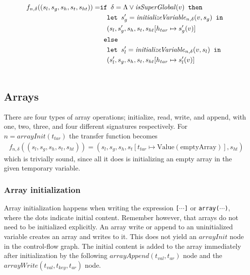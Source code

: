 \begin{align}
f_{n, \delta} ((s_l,s_g,s_h,s_t, s_{ht})) = &\texttt{if }\delta= \Lambda \vee \mathit{isSuperGlobal}(v)\texttt{ then } \notag\\
                                            &\quad\texttt{let }  s_g' = \mathit{initializeVariable}_{n,\delta}(v,s_g) \texttt{ in }\notag\\
                                            &\quad (s_l, s_g', s_h, s_t, s_{ht}[h_{tar}\mapsto s_g'(v)]\notag\\
                                            & \texttt{ else } \notag\\
                                            &\quad\texttt{let }  s_l' = \mathit{initializeVariable}_{n,\delta}(v,s_l) \texttt{ in }\notag\\
                                            &\quad (s_l', s_g, s_h, s_t, s_{ht}[h_{tar}\mapsto s_l'(v)]\notag\\
                                            &
\end{align}

\subsection{Arrays}

There are four types of array operations; initialize, read, write, and append, with one, two, three, and four different signatures respectively. For $n = \mathit{arrayInit}(t_{tar})$ the transfer function becomes
\begin{align}
f_{n,\delta}((s_l, s_g, s_h, s_t, s_{ht})) = (s_l, s_g, s_h, s_t[t_{tar}\mapsto \text{Value}(\text{emptyArray})], s_{ht})
\end{align}
which is trivially sound, since all it does is initializing an empty array in the given temporary variable.

\subsubsection{Array initialization}
Array initialization happens when writing the expression \texttt{[$\cdots$]} or \texttt{array($\cdots$)}, where the dots indicate initial content. Remember however, that arrays do not need to be initialized explicitly. An array write or append to an uninitialized variable creates an array and writes to it. This does not yield an $\mathit{arrayInit}$ node in the control-flow graph. The initial content is added to the array immediately after initialization by the following $\mathit{arrayAppend}(t_{val}, t_{ar})$ node and  the $\mathit{arrayWrite}(t_{val}, t_{key}, t_{ar})$ node.

